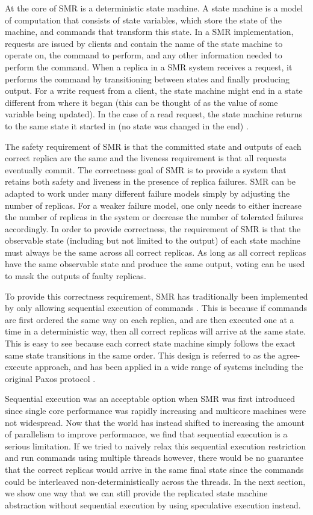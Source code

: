 \documentclass[11pt, oneside]{report}
\begin{document}
At the core of SMR is a deterministic state machine. 
A state machine is a model of computation that consists of state variables, which store the state of the machine, and commands that transform this state. 
In a SMR implementation, requests are issued by clients and contain the name of the state machine to operate on, the command to perform, and any other information needed to perform the command. 
When a replica in a SMR system receives a request, it performs the command by transitioning between states and finally producing output. 
For a write request from a client, the state machine might end in a state different from where it began (this can be thought of as the value of some variable being updated). 
In the case of a read request, the state machine returns to the same state it started in (no state was changed in the end) \cite{schneider}.

The safety requirement of SMR is that the committed state and outputs of each correct replica are the same and the liveness requirement is that all requests eventually commit.
The correctness goal of SMR is to provide a system that retains both safety and liveness in the presence of replica failures. 
SMR can be adapted to work under many different failure models simply by adjusting the number of replicas. 
For a weaker failure model, one only needs to either increase the number of replicas in the system or decrease the number of tolerated failures accordingly.
In order to provide correctness, the requirement of SMR is that the observable state (including but not limited to the output) of each state machine must always be the same across all correct replicas.
As long as all correct replicas have the same observable state and produce the same output, voting can be used to mask the outputs of faulty replicas.

To provide this correctness requirement, SMR has traditionally been implemented by only allowing sequential execution of commands \cite{paxos, paxosMadeSimple, schneider}.
This is because if commands are first ordered the same way on each replica, and are then executed one at a time in a deterministic way, then all correct replicas will arrive at the same state. 
This is easy to see because each correct state machine simply follows the exact same state transitions in the same order. 
This design is referred to as the agree-execute approach, and has been applied in a wide range of systems including the original Paxos protocol \cite{paxos}.

Sequential execution was an acceptable option when SMR was first introduced since single core performance was rapidly increasing and multicore machines were not widespread. 
Now that the world has instead shifted to increasing the amount of parallelism to improve performance, we find that sequential execution is a serious limitation. 
If we tried to naively relax this sequential execution restriction and run commands using multiple threads however, there would be no guarantee that the correct replicas would arrive in the same final state since the commands could be interleaved non-deterministically across the threads. 
In the next section, we show one way that we can still provide the replicated state machine abstraction without sequential execution by using speculative execution instead. 
 
\end{document}
